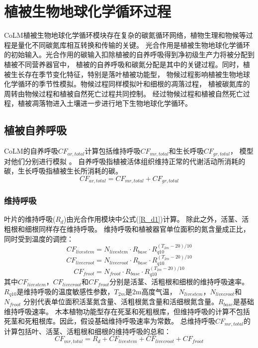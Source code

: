\chapter{植被生物地球化学循环过程}\label{植被生物地球化学循环过程}

CoLM植被生物地球化学循环模块存在复杂的碳氮循环网络，植物生理和物候等过程是量化不同碳氮库相互转换和传输的关键。
光合作用是植被生物地球化学循环的初始输入。光合作用的碳输入扣除植被的自养呼吸得到净初级生产力将被分配到植被不同营养器官中，
植被的自养呼吸和碳氮分配是其中的关键过程。同时，植被生长存在季节变化特征，特别是落叶植被功能型，
物候过程影响植被生物地球化学循环的季节性模拟。物候过程同样模拟叶和细根的凋落过程，
植被碳氮库的周转由物候过程和植被自然死亡过程共同控制。
经过物候过程和植被自然死亡过程，植被凋落物进入土壤进一步进行地下生物地球化学循环。
\section{植被自养呼吸}\label{植被自养呼吸}
CoLM的自养呼吸$CF_{ar,total}$计算包括维持呼吸$CF_{mr,total}$和生长呼吸$CF_{gr,total}$，
模型对他们分别进行模拟 \citep{lavigne1997growth,sprugel1995respiration}。
自养呼吸指植被活体组织维持正常的代谢活动所消耗的碳，生长呼吸指植被生长所消耗的碳。
\begin{equation}
CF_{ar,total}=CF_{mr, total}+CF_{gr,total}
\end{equation}
\subsection{维持呼吸}
叶片的维持呼吸($R_d$)由光合作用模块中公式(\ref{R_d1})计算。
除此之外，活茎、活粗根和细根同样存在维持呼吸。
维持呼吸和植被器官单位面积的氮含量成正比，同时受到温度的调控：
\begin{equation}
CF_{{livestem}}=N_{{livestem }} \cdot R_{{base }} \cdot R_{q10}^{\left(T_{2m}-20\right) / 10}
\end{equation}
\begin{equation}
CF_{ {livecroot }}=N_{ {livecroot }} \cdot R_{ {base }} \cdot R_{q10}^{\left(T_{2m}-20\right) / 10}
\end{equation}
\begin{equation}
CF_{ {froot }}=N_{{froot}} \cdot R_{{base}} \cdot R_{q10}^{\left(T_{2m}-20\right) / 10}
\end{equation}
其中$CF_{livestem}$，$CF_{livecroot}$和$CF_{froot}$分别是活茎、活粗根和细根的维持呼吸速率。
$R_{q10}$是维持呼吸的温度敏感性参数，$T_{2m}$是2m高度气温， $N_{livestem}$，$N_{livecroot}$和$N_{froot}$
分别代表单位面积活茎氮含量、活粗根氮含量和活细根氮含量。$R_{base}$是基础维持呼吸速率。
木本植物功能型存在死茎和死粗根库，但维持呼吸的计算不包括死茎和死粗根库。因此，假设基础维持呼吸速率为常数。
总维持呼吸$CF_{mr,total}$的计算包括叶、活茎、活粗根和细根的维持呼吸的总和：
\begin{equation}
CF_{mr,total}=R_{d}+CF_{livestem}+CF_{livecroot}+CF_{froot}
\end{equation}

